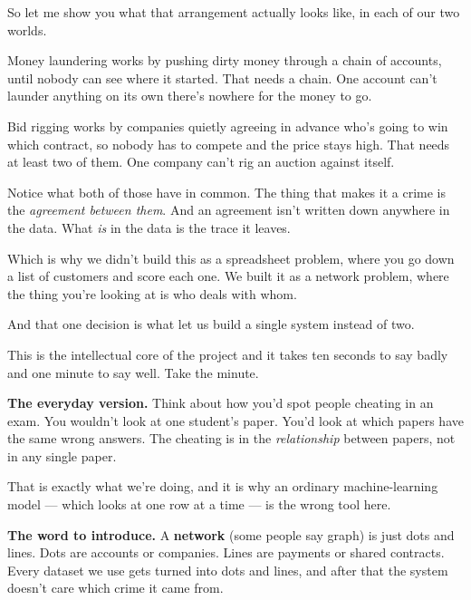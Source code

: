 \documentclass[11pt]{article}
\begin{document}

\begin{saythis}
So let me show you what that arrangement actually looks like, in each of our
two worlds.

Money laundering works by pushing dirty money through a chain of accounts,
until nobody can see where it started. That needs a chain. One account can't
launder anything on its own \bt there's nowhere for the money to go.

Bid rigging works by companies quietly agreeing in advance who's going to win
which contract, so nobody has to compete and the price stays high. That needs
at least two of them. One company can't rig an auction against itself.

Notice what both of those have in common. The thing that makes it a crime is
the \emph{agreement between them}. And an agreement isn't written down anywhere
in the data. What \emph{is} in the data is the trace it leaves.

Which is why we didn't build this as a spreadsheet problem, where you go down a
list of customers and score each one. We built it as a network problem, where
the thing you're looking at is who deals with whom.

And that one decision is what let us build a single system instead of two.
\end{saythis}

\begin{means}
This is the intellectual core of the project and it takes ten seconds to say
badly and one minute to say well. Take the minute.

\textbf{The everyday version.} Think about how you'd spot people cheating in an
exam. You wouldn't look at one student's paper. You'd look at which papers have
the same wrong answers. The cheating is in the \emph{relationship} between
papers, not in any single paper.

That is exactly what we're doing, and it is why an ordinary machine-learning
model --- which looks at one row at a time --- is the wrong tool here.

\textbf{The word to introduce.} A \textbf{network} (some people say graph) is
just dots and lines. Dots are accounts or companies. Lines are payments or
shared contracts. Every dataset we use gets turned into dots and lines, and
after that the system doesn't care which crime it came from.
\end{means}
\end{document}
